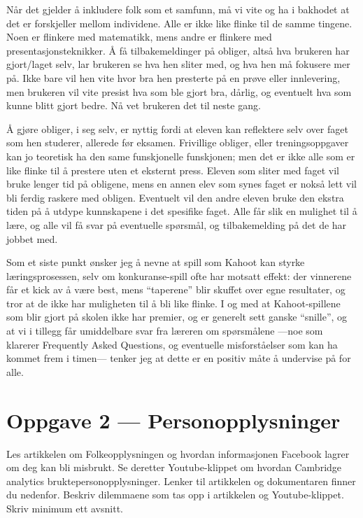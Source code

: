 \documentclass{../../myassignment}
\begin{document}
	\begin{answer}
		Når det gjelder å inkludere folk som et samfunn, må vi vite og ha i bakhodet at det er forskjeller mellom individene. Alle er ikke like flinke til de samme tingene. Noen er flinkere med matematikk, mens andre er flinkere med presentasjonsteknikker. Å få tilbakemeldinger på obliger, altså hva brukeren har gjort/laget selv, lar brukeren se hva hen sliter med, og hva hen må fokusere mer på. Ikke bare vil hen vite hvor bra hen presterte på en prøve eller innlevering, men brukeren vil vite presist hva som ble gjort bra, dårlig, og eventuelt hva som kunne blitt gjort bedre. Nå vet brukeren det til neste gang. 

		Å gjøre obliger, i seg selv, er nyttig fordi at eleven kan reflektere selv over faget som hen studerer, allerede før eksamen. Frivillige obliger, eller treningsoppgaver kan jo teoretisk ha den same funskjonelle funskjonen; men det er ikke alle som er like flinke til å prestere uten et eksternt press. Eleven som sliter med faget vil bruke lenger tid på obligene, mens en annen elev som synes faget er nokså lett vil bli ferdig raskere med obligen. Eventuelt vil den andre eleven bruke den ekstra tiden på å utdype kunnskapene i det spesifike faget. Alle får slik en mulighet til å lære, og alle vil få svar på eventuelle spørsmål, og tilbakemelding på det de har jobbet med. 

		Som et siste punkt ønsker jeg å nevne at spill som Kahoot kan styrke læringsprosessen, selv om konkuranse-spill ofte har motsatt effekt: der vinnerene får et kick av å være best, mens ``taperene'' blir skuffet over egne resultater, og tror at de ikke har muligheten til å bli like flinke. I og med at Kahoot-spillene som blir gjort på skolen ikke har premier, og er generelt sett ganske ``snille'', og at vi i tillegg får umiddelbare svar fra læreren om spørsmålene ---noe som klarerer Frequently Asked Questions, og eventuelle misforståelser som kan ha kommet frem i timen--- tenker jeg at dette er en positiv måte å undervise på for alle. 

	\end{answer}

\newpage
\section*{Oppgave 2 --- Personopplysninger}
	\begin{problem}
		Les artikkelen om Folkeopplysningen og hvordan informasjonen Facebook lagrer om deg kan bli misbrukt. Se deretter Youtube-klippet om hvordan Cambridge analytics bruktepersonopplysninger. Lenker til artikkelen og dokumentaren finner du nedenfor. Beskriv dilemmaene som tas opp i artikkelen og Youtube-klippet. Skriv minimum ett avsnitt.
	\end{problem}
\end{document}
